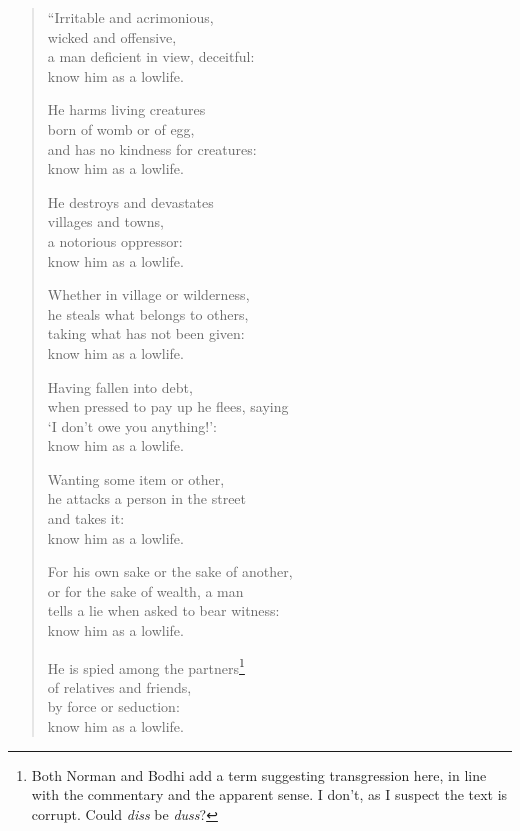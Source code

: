 \documentclass[12pt,openany]{book}%
\begin{document}
\begin{verse}%
“Irritable and acrimonious, \\
wicked and offensive, \\
a man deficient in view, deceitful: \\
know him as a lowlife. 

He harms living creatures \\
born of womb or of egg, \\
and has no kindness for creatures: \\
know him as a lowlife. 

He destroys and devastates \\
villages and towns, \\
a notorious oppressor: \\
know him as a lowlife. 

Whether in village or wilderness, \\
he steals what belongs to others, \\
taking what has not been given: \\
know him as a lowlife. 

Having fallen into debt, \\
when pressed to pay up he flees, saying \\
‘I don’t owe you anything!’: \\
know him as a lowlife. 

Wanting some item or other, \\
he attacks a person in the street \\
and takes it: \\
know him as a lowlife. 

For his own sake or the sake of another, \\
or for the sake of wealth, a man \\
tells a lie when asked to bear witness: \\
know him as a lowlife. 

He is spied among the partners\footnote{Both Norman and Bodhi add a term suggesting transgression here, in line with the commentary and the apparent sense. I don’t, as I suspect the text is corrupt. Could \textit{diss} be \textit{duss}? } \\
of relatives and friends, \\
by force or seduction: \\
know him as a lowlife. 


\end{verse}
\end{document}
